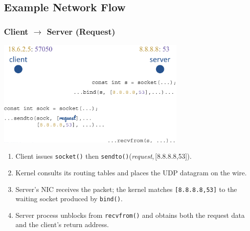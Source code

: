 \documentclass[../../compsys.tex]{subfiles}
\begin{document}
\subsection{Example Network Flow}
\begin{minipage}[t]{0.45\textwidth}
    \small
\subsubsection*{Client $\rightarrow$ Server (Request)}
\vspace{10px}
\begin{center}
  \includegraphics[width=0.7\textwidth]{images/client-to-server-syscalls.png}
\end{center}

\begin{enumerate}
  \item Client issues \texttt{socket()} then \texttt{sendto()}(\textit{request},\,[8.8.8.8,53]).
  \item Kernel consults its routing tables and places the UDP datagram on the wire.
  \item Server's NIC receives the packet; the kernel matches \texttt{[8.8.8.8,53]} to the waiting socket produced by \texttt{bind()}.
  \item Server process unblocks from \texttt{recvfrom()} and obtains both the request data and the client's return address.
\end{enumerate}
\end{minipage}
\end{document}
